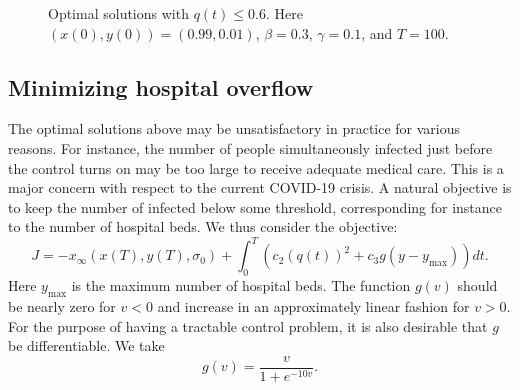 \documentclass[english,12pt,letter]{article}
\newcommand{\Rnot}{\sigma_0}
\newcommand{\Sinf}{x_\infty}
\newcommand{\ymax}{y_\text{max}}
\begin{document}
\begin{figure}
    \centering
    \caption{Optimal solutions with $q(t)\le 0.6$.  Here $(x(0),y(0)) = (0.99,0.01)$, $\beta=0.3$, $\gamma=0.1$, and $T=100$.\label{fig:example_2}}
\end{figure}


\subsection{Minimizing hospital overflow}
The optimal solutions above may be unsatisfactory in practice for various reasons.
For instance, the number of people simultaneously infected just before the control
turns on may be too large to receive adequate medical care.  This is a major concern
with respect to the current COVID-19 crisis.  A natural objective is to keep
the number of infected below some threshold, corresponding for instance to the
number of hospital beds.  We thus consider the objective:
$$
    J = -\Sinf(x(T),y(T),\Rnot) + \int_0^T \left(c_2 (q(t))^2 + c_3 g(y-y_\text{max})\right) dt.
$$
Here $\ymax$ is the maximum number of hospital beds.
The function $g(v)$ should be nearly zero for $v<0$ and increase
in an approximately linear fashion for $v>0$.  For the purpose of having
a tractable control problem, it is also desirable that $g$ be differentiable.
We take
$$
g(v) = \frac{v}{1+e^{-10v}}.
$$
\end{document}
